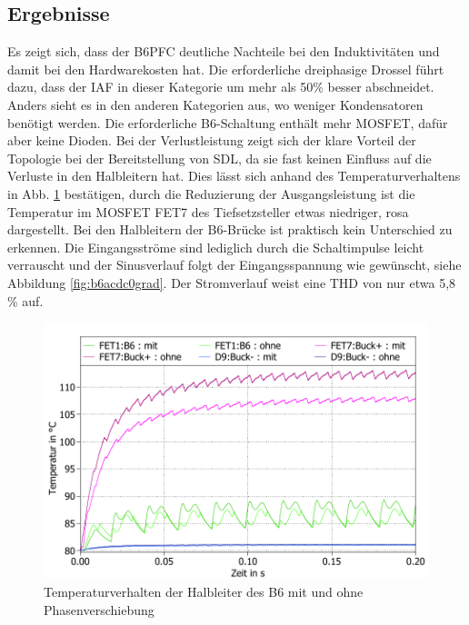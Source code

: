 \subsection{Ergebnisse}
			Es zeigt sich, dass der \gls{B6PFC} deutliche Nachteile bei den Induktivitäten und damit bei den Hardwarekosten hat. Die erforderliche dreiphasige Drossel führt dazu, dass der IAF in dieser Kategorie um mehr als 50\% besser abschneidet.
			Anders sieht es in den anderen Kategorien aus, wo weniger Kondensatoren benötigt werden. Die erforderliche B6-Schaltung enthält mehr \gls{MOSFET}, dafür aber keine Dioden. Bei der Verlustleistung zeigt sich der klare Vorteil der Topologie bei der Bereitstellung von \gls{SDL}, da sie fast keinen Einfluss auf die Verluste in den Halbleitern hat. Dies lässt sich anhand des Temperaturverhaltens in Abb. \ref{fig:b6temp030grad} bestätigen, durch die Reduzierung der Ausgangsleistung ist die Temperatur im \gls{MOSFET} FET7 des Tiefsetzsteller etwas niedriger, rosa dargestellt. Bei den Halbleitern der B6-Brücke ist praktisch kein Unterschied zu erkennen. Die Eingangsströme sind lediglich durch die Schaltimpulse leicht verrauscht und der Sinusverlauf folgt der Eingangsspannung wie gewünscht, siehe Abbildung \ref{fig:b6acdc0grad}.  Der Stromverlauf weist eine THD von nur etwa 5,8 \% auf.
			\begin{figure}
				\centering
				\includegraphics[width=1\linewidth]{content/Grafiken/B6_Temp_0&30Grad}
				\caption{Temperaturverhalten der Halbleiter des B6 mit und ohne Phasenverschiebung}
				\label{fig:b6temp030grad}
			\end{figure}
